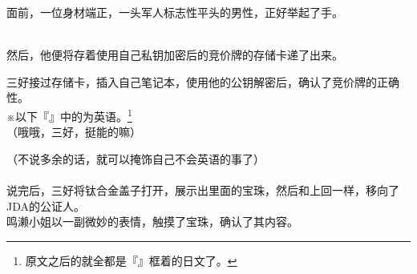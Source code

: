 面前，一位身材端正，一头军人标志性平头的男性，正好举起了手。\\


\\

然后，他便将存着使用自己私钥加密后的竞价牌的存储卡递了出来。

三好接过存储卡，插入自己笔记本，使用他的公钥解密后，确认了竞价牌的正确性。\\

※以下『』中的为英语。\footnote{原文之后的就全都是『』框着的日文了。}\\

（哦哦，三好，挺能的嘛）

（不说多余的话，就可以掩饰自己不会英语的事了）\\

\\

说完后，三好将钛合金盖子打开，展示出里面的宝珠，然后和上回一样，移向了JDA的公证人。\\

鸣濑小姐以一副微妙的表情，触摸了宝珠，确认了其内容。\\

